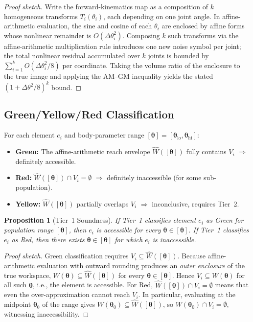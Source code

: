 \documentclass[11pt,letterpaper]{article}
\newtheorem{proposition}[theorem]{Proposition}
\newcommand{\bodyp}{\boldsymbol{\theta}}
\begin{document}
\begin{proof}[Proof sketch]
Write the forward-kinematics map as a composition of $k$ homogeneous transforms $T_i(\theta_i)$, each depending on one joint angle.
In affine-arithmetic evaluation, the sine and cosine of each $\theta_i$ are enclosed by affine forms whose nonlinear remainder is $O(\Delta\theta_i^2)$.
Composing $k$ such transforms via the affine-arithmetic multiplication rule introduces one new noise symbol per joint; the total nonlinear residual accumulated over $k$ joints is bounded by $\sum_{i=1}^{k} O(\Delta\theta_i^2/8)$ per coordinate.
Taking the volume ratio of the enclosure to the true image and applying the AM--GM inequality yields the stated $(1 + \Delta\theta^2/8)^k$ bound.
\end{proof}

\subsection{Green/Yellow/Red Classification}

For each element $e_i$ and body-parameter range $[\bodyp] = [\bodyp_{\mathrm{lo}}, \bodyp_{\mathrm{hi}}]$:
\begin{itemize}[nosep]
  \item \textbf{Green:} The affine-arithmetic reach envelope $\widehat{W}([\bodyp])$ fully contains $V_i$ $\Rightarrow$ definitely accessible.
  \item \textbf{Red:} $\widehat{W}([\bodyp]) \cap V_i = \emptyset$ $\Rightarrow$ definitely inaccessible (for some sub-population).
  \item \textbf{Yellow:} $\widehat{W}([\bodyp])$ partially overlaps $V_i$ $\Rightarrow$ inconclusive, requires Tier~2.
\end{itemize}

\begin{proposition}[Tier~1 Soundness]
If Tier~1 classifies element $e_i$ as Green for population range $[\bodyp]$, then $e_i$ is accessible for every $\bodyp \in [\bodyp]$.
If Tier~1 classifies $e_i$ as Red, then there exists $\bodyp \in [\bodyp]$ for which $e_i$ is inaccessible.
\end{proposition}

\begin{proof}[Proof sketch]
Green classification requires $V_i \subseteq \widehat{W}([\bodyp])$.
Because affine-arithmetic evaluation with outward rounding produces an \emph{outer enclosure} of the true workspace, $W(\bodyp) \subseteq \widehat{W}([\bodyp])$ for every $\bodyp \in [\bodyp]$.
Hence $V_i \subseteq W(\bodyp)$ for all such $\bodyp$, i.e., the element is accessible.
For Red, $\widehat{W}([\bodyp]) \cap V_i = \emptyset$ means that even the over-approximation cannot reach $V_i$.
In particular, evaluating at the midpoint $\bodyp_0$ of the range gives $W(\bodyp_0) \subseteq \widehat{W}([\bodyp])$, so $W(\bodyp_0) \cap V_i = \emptyset$, witnessing inaccessibility.
\end{proof}
\end{document}
